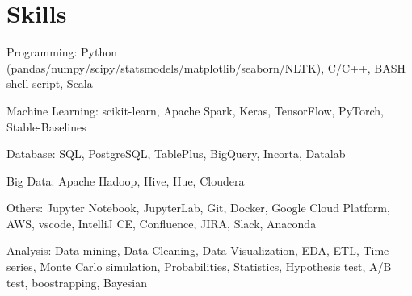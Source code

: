 \documentclass[letterpaper]{deedy-resume-openfont}
\begin{document}
\section{Skills}
\location{}
\vspace{-0.4cm}
\begin{tightemize}
    \item Programming: Python (pandas/numpy/scipy/statsmodels/matplotlib/seaborn/NLTK), C/C++, BASH shell script, Scala
    \item Machine Learning: scikit-learn, Apache Spark, Keras, TensorFlow, PyTorch, Stable-Baselines
    \item Database: SQL, PostgreSQL, TablePlus, BigQuery, Incorta, Datalab
    \item Big Data: Apache Hadoop, Hive, Hue, Cloudera
    \item Others: Jupyter Notebook, JupyterLab, Git, Docker, Google Cloud Platform, AWS, vscode, IntelliJ CE, Confluence, JIRA, Slack, Anaconda
    \item Analysis: Data mining, Data Cleaning, Data Visualization, EDA, ETL, Time series, Monte Carlo simulation, Probabilities, Statistics, Hypothesis test, A/B test, boostrapping, Bayesian
\end{tightemize}
\sectionsep



%     
\end{document}

